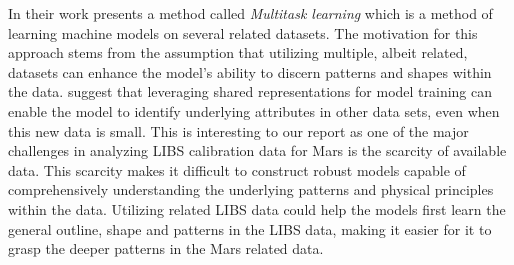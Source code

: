 In their work \citet{caruana_no_1997} presents a method called \textit{Multitask learning} which is a method of learning machine models on several related datasets. 
The motivation for this approach stems from the assumption that utilizing multiple, albeit related, datasets can enhance the model's ability to discern patterns and shapes within the data.
\citet{caruana_no_1997} suggest that leveraging shared representations for model training can enable the model to identify underlying attributes in other data sets, even when this new data is small.
This is interesting to our report as one of the major challenges in analyzing LIBS calibration data for Mars is the scarcity of available data.
This scarcity makes it difficult to construct robust models capable of comprehensively understanding the underlying patterns and physical principles within the data.
Utilizing related LIBS data could help the models first learn the general outline, shape and patterns in the LIBS data, making it easier for it to grasp the deeper patterns in the Mars related data.


